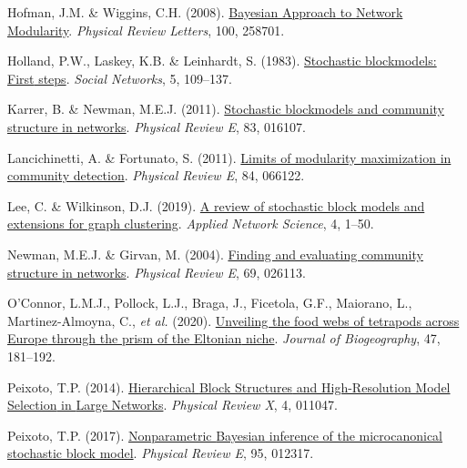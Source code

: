 \documentclass[
]{article}
\newlength{\cslhangindent}
\newlength{\cslentryspacingunit} %
\newenvironment{CSLReferences}[2] %
 {%
  \setlength{\parindent}{0pt}
  \ifodd #1
  \let\oldpar\par
  \def\par{\hangindent=\cslhangindent\oldpar}
  \fi
  \setlength{\parskip}{#2\cslentryspacingunit}
 }%
 {}
\begin{document}
\begin{CSLReferences}{1}{0}
\leavevmode{}%
Hofman, J.M. \& Wiggins, C.H. (2008).
\href{https://doi.org/10.1103/PhysRevLett.100.258701}{Bayesian
{Approach} to {Network Modularity}}. \emph{Physical Review Letters},
100, 258701.

\leavevmode{}%
Holland, P.W., Laskey, K.B. \& Leinhardt, S. (1983).
\href{https://doi.org/10.1016/0378-8733(83)90021-7}{Stochastic
blockmodels: {First} steps}. \emph{Social Networks}, 5, 109--137.

\leavevmode{}%
Karrer, B. \& Newman, M.E.J. (2011).
\href{https://doi.org/10.1103/PhysRevE.83.016107}{Stochastic blockmodels
and community structure in networks}. \emph{Physical Review E}, 83,
016107.

\leavevmode{}%
Lancichinetti, A. \& Fortunato, S. (2011).
\href{https://doi.org/10.1103/PhysRevE.84.066122}{Limits of modularity
maximization in community detection}. \emph{Physical Review E}, 84,
066122.

\leavevmode{}%
Lee, C. \& Wilkinson, D.J. (2019).
\href{https://doi.org/10.1007/s41109-019-0232-2}{A review of stochastic
block models and extensions for graph clustering}. \emph{Applied Network
Science}, 4, 1--50.

\leavevmode{}%
Newman, M.E.J. \& Girvan, M. (2004).
\href{https://doi.org/10.1103/PhysRevE.69.026113}{Finding and evaluating
community structure in networks}. \emph{Physical Review E}, 69, 026113.

\leavevmode{}%
O'Connor, L.M.J., Pollock, L.J., Braga, J., Ficetola, G.F., Maiorano,
L., Martinez-Almoyna, C., \emph{et al.} (2020).
\href{https://doi.org/10.1111/jbi.13773}{Unveiling the food webs of
tetrapods across {Europe} through the prism of the {Eltonian} niche}.
\emph{Journal of Biogeography}, 47, 181--192.

\leavevmode{}%
Peixoto, T.P. (2014).
\href{https://doi.org/10.1103/PhysRevX.4.011047}{Hierarchical {Block
Structures} and {High-Resolution Model Selection} in {Large Networks}}.
\emph{Physical Review X}, 4, 011047.

\leavevmode{}%
Peixoto, T.P. (2017).
\href{https://doi.org/10.1103/PhysRevE.95.012317}{Nonparametric
{Bayesian} inference of the microcanonical stochastic block model}.
\emph{Physical Review E}, 95, 012317.


\end{CSLReferences}
\end{document}
